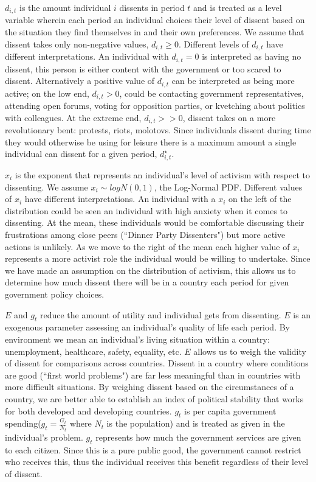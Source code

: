 \documentclass[12pt]{article}
\begin{document}
\begin{spacing}{1.5}
$ d_{i,t} $ is the amount individual $i$ dissents in period $t$ and is treated as a level variable wherein each period an individual choices their level of dissent based on the situation they find themselves in and their own preferences. We assume that dissent takes only non-negative values, $d_{i,t}\geq0$. Different levels of $d_{i,t}$ have different interpretations. An individual with $d_{i,t}=0$ is interpreted as having no dissent, this person is either content with the government or too scared to dissent. Alternatively a positive value of $d_{i,t}$ can be interpreted as being more active; on the low end, $d_{i,t}>0$, could be contacting government representatives, attending open forums, voting for opposition parties, or kvetching about politics with colleagues. At the extreme end, $d_{i,t}>>0$, dissent takes on a more revolutionary bent: protests, riots, molotovs. Since individuals dissent during time they would otherwise be using for leisure there is a maximum amount a single individual can dissent for a given period, $d_{i,t}^\star$. 

$x_i$ is the exponent that represents an individual's level of activism with respect to dissenting. We assume $x_i \sim logN(0,1)$, the Log-Normal PDF. Different values of $x_i$ have different interpretations. An individual with a $x_i$ on the left of the distribution could be seen an individual with high anxiety when it comes to dissenting. At the mean, these individuals would be comfortable discussing their frustrations among close peers (``Dinner Party Dissenters") but more active actions is unlikely. As we move to the right of the mean each higher value of $x_i$ represents a more activist role the individual would be willing to undertake. Since we have made an assumption on the distribution of activism, this allows us to determine how much dissent there will be in a country each period for given government policy choices.    

$E$ and $g_t$ reduce the amount of utility and individual gets from dissenting. $E$ is an exogenous parameter assessing an individual's quality of life each period. By environment we mean an individual's living situation within a country: unemployment, healthcare, safety, equality, etc. $E$ allows us to weigh the validity of dissent for comparisons across countries. Dissent in a country where conditions are good (``first world problems")  are far less meaningful than in countries with more difficult situations. By weighing dissent based on the circumstances of a country, we are better able to establish an index of political stability that works for both developed and developing countries. $g_t$ is per capita government spending($g_t=\frac{G_t}{N_t}$ where $N_t$ is the population) and is treated as given in the individual's problem. $g_t$ represents how much the government services are given to each citizen. Since this is a pure public good, the government cannot restrict who receives this, thus the individual receives this benefit regardless of their level of dissent. 


\end{spacing}
\end{document}
